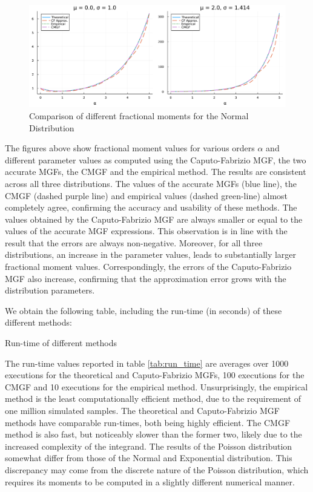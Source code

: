 \begin{figure}[H]
    \centering
    \includegraphics[width=1.1\textwidth]{figures/normal_value_comparison_normal.pdf}
    \caption{Comparison of different fractional moments for the Normal Distribution}
    \label{fig:normal_plot_values}
\end{figure}

The figures above show fractional moment values for various orders \(\alpha\) and different parameter values as computed using the Caputo-Fabrizio MGF, the two accurate MGFs, the CMGF and the empirical method. The results are consistent across all three distributions. The values of the accurate MGFs (blue line), the CMGF (dashed purple line) and empirical values (dashed green-line) almost completely agree, confirming the accuracy and usability of these methods. The values obtained by the Caputo-Fabrizio MGF are always smaller or equal to the values of the accurate MGF expressions. This observation is in line with the result that the errors are always non-negative. Moreover, for all three distributions, an increase in the parameter values, leads to substantially larger fractional moment values. Correspondingly, the errors of the Caputo-Fabrizio MGF also increase, confirming that the approximation error grows with the distribution parameters. 

We obtain the following table, including the run-time (in seconds) of these different methods:
\begin{table}[H]
    \centering 

\caption{Run-time of different methods} 
\label{tab:run_time}
\end{table}
The run-time values reported in table \ref{tab:run_time} are averages over 1000 executions for the theoretical and Caputo-Fabrizio MGFs, 100 executions for the CMGF and 10 executions for the empirical method. Unsurprisingly, the empirical method is the least computationally efficient method, due to the requirement of one million simulated samples. The theoretical and Caputo-Fabrizio MGF methods have comparable run-times, both being highly efficient. The CMGF method is also fast, but noticeably slower than the former two, likely due to the increased complexity of the integrand. The results of the Poisson distribution somewhat differ from those of the Normal and Exponential distribution. This discrepancy may come from  the discrete nature of the Poisson distribution, which requires its moments to be computed in a slightly different numerical manner.

